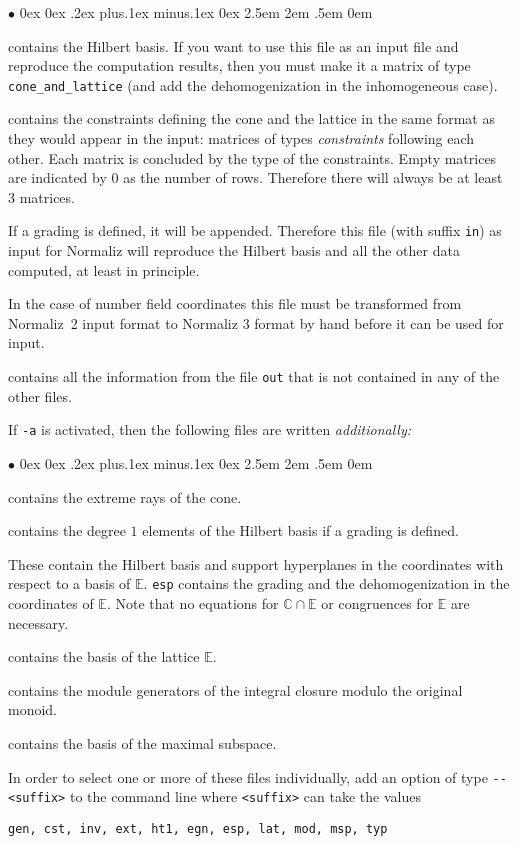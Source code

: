 \documentclass[12pt,a4paper]{scrartcl}
\newcommand{\stdli}{ \topsep0ex \partopsep0ex %
\parsep.2ex plus.1ex minus.1ex \itemsep0ex%
\leftmargin2.5em \labelwidth2em \labelsep.5em \rightmargin0em}%
\renewenvironment{itemize}{\begin{list}{{$\bullet$}}{\stdli}}{\end{list}}
\theoremstyle{definition}
\def\CC{{\mathbb C}}
\def\EE{{\mathbb E}}
\def\itemtt[#1]{\item[\textbf{\ttt{#1}}]}
\def\ttt{\texttt}
\begin{document}
\begin{itemize}
	\itemtt[gen] contains the Hilbert basis. If you want to use this file as an input file and reproduce the computation results, then you must make it a matrix of type \verb|cone_and_lattice| (and add the dehomogenization in the inhomogeneous case).
	
	\itemtt[cst] contains the constraints defining the cone
	and the lattice in the same format as they would appear
	in the input: matrices of types \emph{constraints} following each
	other. Each matrix is concluded by the type of the constraints.
	Empty matrices are indicated by $0$ as the
	number of rows. Therefore there will always be at least
	$3$ matrices.
	
	If a grading is defined, it will be appended. Therefore
	this file (with suffix \ttt{in}) as input for
	Normaliz will reproduce the Hilbert basis and all the
	other data computed, at least in principle.
	
	In the case of number field coordinates this file must be transformed from Normaliz~2 input format to Normaliz 3 format by hand before it can be used for input.
	
	\itemtt[inv]  contains all the information from the
	file \ttt{out} that is not contained in any of the
	other files.
\end{itemize}

If \ttt{-a} is activated, then the following files are written
\emph{additionally:}

\begin{itemize}
	
	\itemtt[ext] contains the extreme rays of the cone.
	
	\itemtt[ht1] contains the degree $1$ elements of the
	Hilbert basis if a grading is defined.
	
	\itemtt[egn,esp] These contain the Hilbert basis and
	support hyperplanes in the coordinates with respect to
	a basis of $\EE$. \ttt{esp} contains the grading and the dehomogenization in the
	coordinates of $\EE$. Note that no
	equations for $\CC\cap\EE$ or congruences for $\EE$ are
	necessary.
	
	\itemtt[lat] contains the basis of the lattice $\EE$.
	
	\itemtt[mod] contains the module generators of the integral closure modulo the original monoid.
	
	\itemtt[msp] contains the basis of the maximal subspace.
\end{itemize}

In order to select one or more of these files individually, add an option of type \verb|--<suffix>| to the command line where \verb|<suffix>| can take the values
\begin{Verbatim}
gen, cst, inv, ext, ht1, egn, esp, lat, mod, msp, typ
\end{Verbatim}
\end{document}
